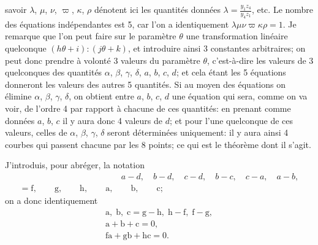 \documentclass[12pt,a4paper,oneside]{book}
\theoremstyle{plain}
\theoremstyle{definition}
\theoremstyle{remark}
\begin{document}
savoir $\lambda$, $\mu$, $\nu$, $\varpi$, $\kappa$, $\rho$ d\'enotent ici les quantit\'es donn\'ees $\lambda=\frac{y_1z_4}{y_4z_1}$, etc. Le nombre des \'equations ind\'ependantes est 5, car l'on a identiquement $\lambda\mu\nu\varpi\kappa\rho=1$. Je remarque que l'on peut faire sur le param\`etre $\theta$ une transformation lin\'eaire quelconque $(h\theta+i):(j\theta+k)$, et introduire ainsi 3 constantes arbitraires; on peut donc prendre \`a volont\'e 3 valeurs du param\`etre $\theta$, c'est-\`a-dire les valeurs de 3 quelconques des quantit\'es $\alpha$, $\beta$, $\gamma$, $\delta$, $a$, $b$, $c$, $d$; et cela \'etant les 5 \'equations donneront les valeurs des autres 5 quantit\'es. Si au moyen des \'equations on \'elimine $\alpha$, $\beta$, $\gamma$, $\delta$, on obtient entre $a$, $b$, $c$, $d$ une \'equation qui sera, comme on va voir, de l'ordre 4 par rapport \`a chacune de ces quantit\'es: en prenant comme donn\'ees $a$, $b$, $c$ il y aura donc 4 valeurs de $d$; et pour l'une quelconque de ces valeurs, celles de $\alpha$, $\beta$, $\gamma$, $\delta$ seront d\'etermin\'ees uniquement: il y aura ainsi 4 courbes qui passent chacune par les 8 points; ce qui est le th\'eor\`eme dont il s'agit.

J'introduis, pour abr\'eger, la notation
\begin{gather*}
\phantom{=\mathrm{f},\quad\mathrm{g},\quad\mathrm{h},\quad\mathrm{a},\quad\mathrm{b},\quad\mathrm{c};}a-d,\quad b-d,\quad c-d,\quad b-c,\quad c-a,\quad a-b,\\
=\mathrm{f},\qquad\mathrm{g},\qquad\mathrm{h},\qquad\mathrm{a},\qquad\mathrm{b},\qquad\mathrm{c};
\end{gather*}
on a donc identiquement
\begin{gather*}
\mathrm{a},\;\mathrm{b},\;\mathrm{c}=\mathrm{g}-\mathrm{h},\;\mathrm{h}-\mathrm{f},\;\mathrm{f}-\mathrm{g},\\
\mathrm{a}+\mathrm{b}+\mathrm{c}=0,\\
\mathrm{fa}+\mathrm{gb}+\mathrm{hc}=0.
\end{gather*}
\end{document}
